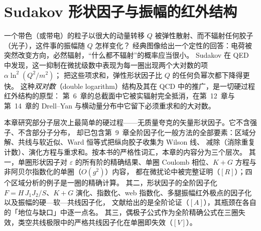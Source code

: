 \chapter{Sudakov 形状因子与振幅的红外结构}\label{ch:sudakov}

一个带色（或带电）的粒子以很大的动量转移 $Q$ 被弹性散射、而不辐射任何胶子（光子），这件事的振幅随 $Q$ 怎样变化？
经典图像给出一个定性的回答：电荷被突然改变方向，必然辐射，“什么都不辐射”的概率应当很小。
Sudakov 在 QED 中发现\cite{Sudakov1956}，这一抑制在微扰级数中表现为每一圈出现两个大对数的项 $\alpha\ln^2(Q^2/m^2)$；
把这些项求和，弹性形状因子比 $Q$ 的任何负幂次都下降得更快。
这种\emph{双对数}（double logarithm）结构及其在 QCD 中的推广，是一切硬过程红外结构的原型：
第~6~章的总截面中它被实辐射完全抵消，在第~12~章与第~14~章的 Drell--Yan 与横动量分布中它留下必须重求和的大对数。

本章研究部分子层次上最简单的硬过程——无质量夸克的矢量形状因子。它不含强子、不含部分子分布，
却已包含第~9~章全阶因子化一般方法的全部要素：区域分解、共线与软近似、Ward 恒等式把纵向胶子收集为 Wilson 线、
减除（消除重复计数）、演化方程与重求和。按本书的严格性词汇，本章的内容分为三个层次。
其一，单圈形状因子对 $\varepsilon$ 的所有阶的精确结果、单圈 Coulomb 相位、$K+G$ 方程与非阿贝尔指数化的单圈（$O(g^2)$）内容，
都在微扰论中被完整证明（$[R]$）；四个区域分析的例子是一圈的精确计算。
其二，形状因子的全阶因子化 $F=H\,J_1J_2/S$、$K+G$ 演化、指数化、web 指数化、多腿振幅红外极点的因子化以及振幅的硬—软—共线因子化，
文献给出的是全阶论证（$[A]$），其瓶颈在各自的「地位与缺口」中逐一点名。
其三，偶极子公式作为全阶精确公式在三圈失效，类空共线极限中的严格共线因子化在单圈即失效（$[V]$）。

